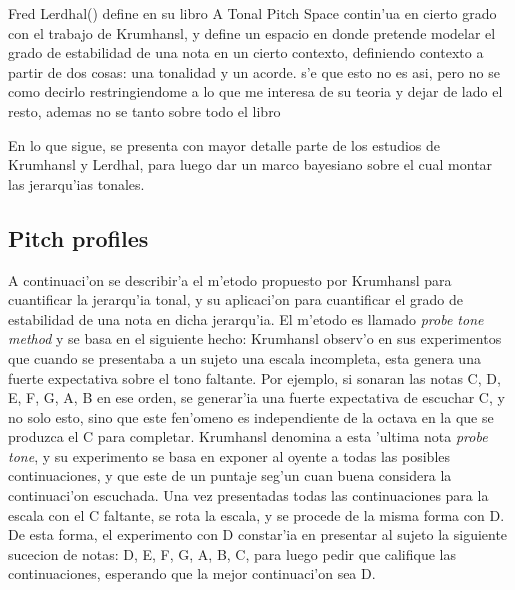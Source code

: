 
Fred Lerdhal(\cita) define en su libro A Tonal Pitch Space contin'ua en cierto grado con el trabajo de Krumhansl, y define un espacio en donde pretende 
modelar el grado de estabilidad de una nota en un cierto contexto, definiendo contexto a partir de dos cosas: una tonalidad y un acorde. \alert{s'e que esto no es asi, pero no se como decirlo restringiendome a lo que me interesa de su teoria y dejar de lado el resto, ademas no se tanto sobre todo el libro}

En lo que sigue, se presenta con mayor detalle parte de los estudios de Krumhansl y Lerdhal, para luego dar un marco bayesiano sobre el cual montar las jerarqu'ias tonales.

\subsection{Pitch profiles}
A continuaci'on se describir'a el m'etodo propuesto por Krumhansl para cuantificar la jerarqu'ia tonal, y su aplicaci'on para cuantificar el grado de estabilidad 
de una nota en dicha jerarqu'ia. 
El m'etodo es llamado \emph{probe tone method} y se basa en el siguiente hecho: Krumhansl observ'o en sus experimentos que cuando se presentaba a un sujeto una escala 
incompleta, esta genera una fuerte expectativa sobre el tono faltante. Por ejemplo, si sonaran las notas C, D, E, F, G, A, B en ese orden, se generar'ia una fuerte 
expectativa de escuchar C, y no solo esto, sino que este fen'omeno es independiente de la octava en la que se produzca el C para completar.
Krumhansl denomina a esta 'ultima nota \emph{probe tone}, y su experimento se basa en exponer al oyente a todas las posibles continuaciones, y que este de un puntaje
seg'un cuan buena considera la continuaci'on escuchada. Una vez presentadas todas las continuaciones para la escala con el C faltante, se rota la escala, y se procede
de la misma forma con D. De esta forma, el experimento con D constar'ia en presentar al sujeto la siguiente sucecion de notas: D, E, F, G, A, B, C, para luego pedir
que califique las continuaciones, esperando que la mejor continuaci'on sea D.

